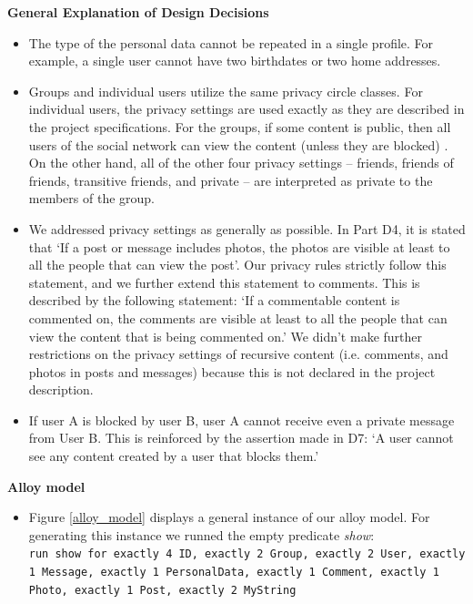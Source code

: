 \documentclass[pdftex,12pt,a4paper]{scrartcl}
\begin{document}
\newpage
{\bf General Explanation of Design Decisions}
\begin{itemize}
  \item The type of the personal data cannot be repeated in a single profile. For example, a single user cannot have two birthdates or two home addresses.
  \item Groups and individual users utilize the same privacy circle classes. For individual users, the privacy settings are used exactly as they are described in the project specifications. For the groups, if some content is public, then all users of the social network can view the content (unless they are blocked) . On the other hand, all of the other four privacy settings -- friends, friends of friends, transitive friends, and private -- are interpreted as private to the members of the group.
  \item We addressed privacy settings as generally as possible. In Part D4, it is stated that `If a post or message includes photos, the photos are visible at least to all the people that can view the post'. Our privacy rules strictly follow this statement, and we further extend this statement to comments. This is described by the following statement: `If a commentable content is commented on, the comments are visible at least to all the people that can view the content that is being commented on.' We didn't make further restrictions on the privacy settings of recursive content (i.e. comments, and photos in posts and messages) because this is not declared in the project description.
  \item	If user A is blocked by user B, user A cannot receive even a private message from User B. This is reinforced by the assertion made in D7: `A user cannot see any content created by a user that blocks them.'
\end{itemize}

{\bf Alloy model}
\begin{itemize}
  \item Figure \ref{alloy_model} displays a general instance of our alloy model. For generating this instance we runned the empty predicate {\it show}:\\
\texttt{run show for exactly 4 ID, exactly 2 Group, exactly 2 User, exactly 1 Message, exactly 1 PersonalData, exactly 1 Comment, exactly 1 Photo, exactly 1 Post, exactly 2 MyString}
\end{itemize}
\end{document}
